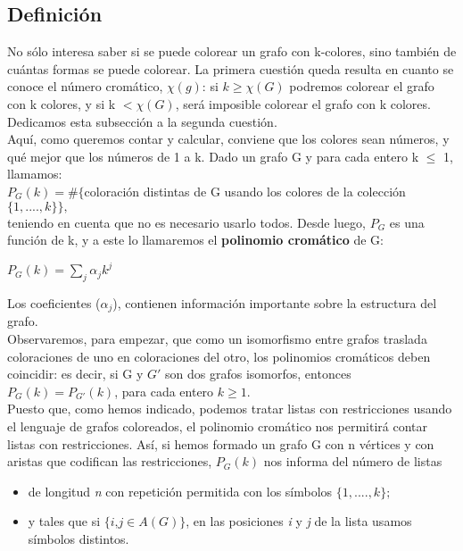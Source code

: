 \documentclass[12pt]{report}
\begin{document}
\subsection{Definición}
No sólo interesa saber si se puede colorear un grafo con k-colores, sino también de cuántas formas se puede colorear. La primera cuestión queda resulta en cuanto se conoce el número cromático, $\chi(g)$: si $k \geq \chi(G)$ podremos colorear el grafo con k colores, y si k $< \chi(G)$, será imposible colorear el grafo con k colores. Dedicamos esta subsección a la segunda cuestión.\\
Aquí, como queremos contar y calcular, conviene que los colores sean números, y qué mejor que los números de 1 a k. Dado un grafo G y para cada entero k $\leq$ 1, llamamos: \\
$P_G(k) = \# \{$coloración distintas de G usando los colores de la colección $\{1,....,k\}\},$
\\teniendo en cuenta que no es necesario usarlo todos. Desde luego, $P_G$ es una función de k, y a este lo llamaremos el \textbf{polinomio cromático} de G:\\
\begin{center}
$P_G(k) = \sum_j \alpha_j k^j$
\end{center}
Los coeficientes ($\alpha_j$), contienen información importante sobre la estructura del grafo.\\
Observaremos, para empezar, que como un isomorfismo entre grafos traslada coloraciones de uno en coloraciones del otro, los polinomios cromáticos deben coincidir: es decir, si G y $G'$ son dos grafos isomorfos, entonces $P_G(k) = P_{G'}(k)$, para cada entero $k \geq 1.$\\
Puesto que, como hemos indicado, podemos tratar listas con restricciones usando el lenguaje de grafos coloreados, el polinomio cromático nos permitirá contar listas con restricciones. Así, si hemos formado un grafo G con n vértices y con aristas que codifican las restricciones, $P_G(k)$ nos informa del número de listas
\begin{itemize}
\item de longitud \textit{n} con repetición permitida con los símbolos $\{1,....,k\};$
\item y tales que si $\{\textit{i,j} \in A(G)\}$, en las posiciones \textit{i} y \textit{j} de la lista usamos símbolos distintos.
\end{itemize}
\end{document}
